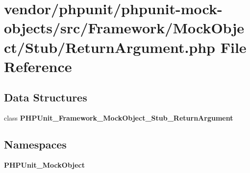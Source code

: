 \section{vendor/phpunit/phpunit-\/mock-\/objects/src/\+Framework/\+Mock\+Object/\+Stub/\+Return\+Argument.php File Reference}
\label{_return_argument_8php}
\subsection*{Data Structures}
\begin{DoxyCompactItemize}
\item 
class {\bf P\+H\+P\+Unit\+\_\+\+Framework\+\_\+\+Mock\+Object\+\_\+\+Stub\+\_\+\+Return\+Argument}
\end{DoxyCompactItemize}
\subsection*{Namespaces}
\begin{DoxyCompactItemize}
\item 
 {\bf P\+H\+P\+Unit\+\_\+\+Mock\+Object}
\end{DoxyCompactItemize}
